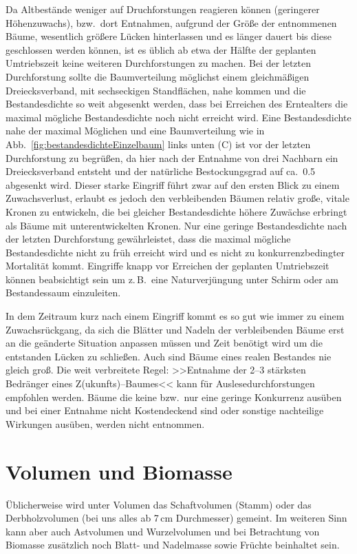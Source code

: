 \documentclass[twocolumn]{scrartcl}
\begin{document}
Da Altbestände weniger auf Druchforstungen reagieren können (geringerer
Höhenzuwachs), bzw.\ dort Entnahmen, aufgrund der Größe der entnommenen Bäume,
wesentlich größere Lücken hinterlassen und es länger dauert bis diese
geschlossen werden können, ist es üblich ab etwa der Hälfte der geplanten
Umtriebszeit keine weiteren Durchforstungen zu machen. Bei der letzten
Durchforstung sollte die Baumverteilung möglichst einem gleichmäßigen
Dreiecksverband, mit sechseckigen Standflächen, nahe kommen und die
Bestandesdichte so weit abgesenkt werden, dass bei Erreichen des Erntealters die
maximal mögliche Bestandesdichte noch nicht erreicht wird. Eine Bestandesdichte
nahe der maximal Möglichen und eine Baumverteilung wie in
Abb.~\ref{fig:bestandesdichteEinzelbaum} links unten (C) ist vor der letzten
Durchforstung zu begrüßen, da hier nach der Entnahme von drei Nachbarn ein
Dreiecksverband entsteht und der natürliche Bestockungsgrad auf ca.\ 0.5
abgesenkt wird. Dieser starke Eingriff führt zwar auf den ersten Blick zu einem
Zuwachsverlust, erlaubt es jedoch den verbleibenden Bäumen relativ große, vitale
Kronen zu entwickeln, die bei gleicher Bestandesdichte höhere Zuwächse erbringt
als Bäume mit unterentwickelten Kronen. Nur eine geringe Bestandesdichte nach
der letzten Durchforstung gewährleistet, dass die maximal mögliche
Bestandesdichte nicht zu früh erreicht wird und es nicht zu konkurrenzbedingter
Mortalität kommt. Eingriffe knapp vor Erreichen der geplanten Umtriebszeit
können beabsichtigt sein um z.\,B.\ eine Naturverjüngung unter Schirm oder am
Bestandessaum einzuleiten.

In dem Zeitraum kurz nach einem Eingriff kommt es so gut wie immer zu einem
Zuwachsrückgang, da sich die Blätter und Nadeln der verbleibenden Bäume erst an
die geänderte Situation anpassen müssen und Zeit benötigt wird um die entstanden
Lücken zu schließen. Auch sind Bäume eines realen Bestandes nie gleich groß. Die
weit verbreitete Regel: >>Entnahme der 2--3 stärksten Bedränger eines
Z(ukunfts)--Baumes<< kann für Auslesedurchforstungen empfohlen werden. Bäume die
keine bzw.\ nur eine geringe Konkurrenz ausüben und bei einer Entnahme nicht
Kostendeckend sind oder sonstige nachteilige Wirkungen ausüben, werden nicht
entnommen.

\section{Volumen und Biomasse}

Üblicherweise wird unter Volumen das Schaftvolumen (Stamm) oder das
Derbholzvolumen (bei uns alles ab 7\,cm Durchmesser) gemeint. Im weiteren Sinn
kann aber auch Astvolumen und Wurzelvolumen und bei Betrachtung von Biomasse
zusätzlich noch Blatt- und Nadelmasse sowie Früchte beinhaltet sein.
\end{document}
